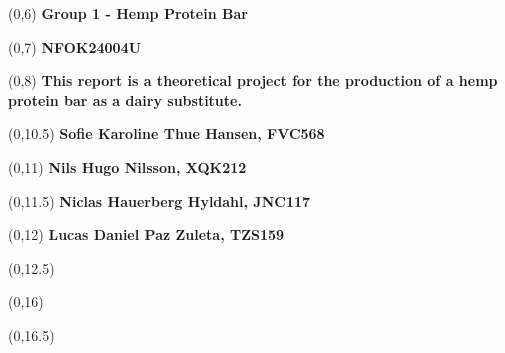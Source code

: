 \begin{titlepage}

    
    \begin{textblock}{9.4}(0,6)
        \Huge{\selectfont\bfseries{Group 1 - Hemp Protein Bar}}
    \end{textblock}
    \begin{textblock}{9.4}(0,7)
        \Huge{\selectfont\bfseries{NFOK24004U}}
    \end{textblock}
    
    \begin{textblock}{9.4}(0,8)
        \LARGE{\selectfont\bfseries{This report is a theoretical project for the production of a hemp protein bar as a dairy substitute.}}
    \end{textblock}
    
    \begin{textblock}{9.4}(0,10.5)
        \large{\selectfont\bfseries{
        Sofie Karoline Thue Hansen, FVC568}}
    \end{textblock}
    \begin{textblock}{9.4}(0,11)
        \large{\selectfont\bfseries{
        Nils Hugo Nilsson, XQK212}}
    \end{textblock}
    \begin{textblock}{9.4}(0,11.5)
        \large{\selectfont\bfseries{
        Niclas Hauerberg Hyldahl, JNC117}}
    \end{textblock}
    \begin{textblock}{9.4}(0,12)
        \large{\selectfont\bfseries{
        Lucas Daniel Paz Zuleta, TZS159}}
    \end{textblock}
    
    \begin{textblock}{9.4}(0,12.5)
        \large{\selectfont{MSc students at the University of Copenhagen}}
    \end{textblock}
    
    \begin{textblock}{9.4}(0,16)
        \large{\selectfont{Last compiled: \today}}
    \end{textblock}
    
    \begin{textblock}{8.4}(0,16.5)
        \large{}
    \end{textblock}
    

\end{titlepage}
